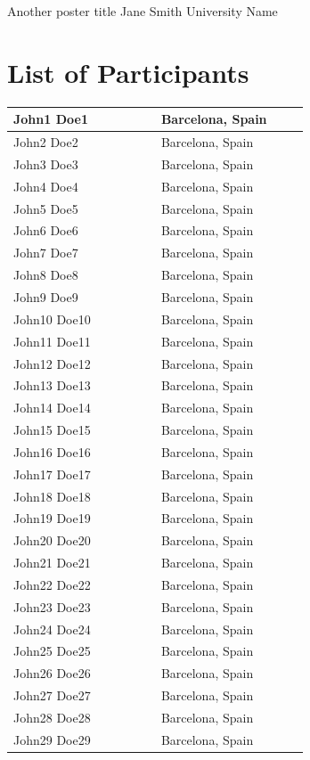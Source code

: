 \documentclass[
openany, %
parskip=full, %
12pt, %
a4paper, %
]{conferencebooklet} %
\begin{document}
	\poster
	{Another poster title} %
	{Jane Smith} %
	{University Name} %
	
	
	\chapter{List of Participants}
	
	\begingroup
	\begin{longtable}{p{0.4\linewidth} p{0.4\linewidth}}
		\hline
		John1 Doe1 & Barcelona, Spain \\ \hline
		John2 Doe2 & Barcelona, Spain \\ \hline
		John3 Doe3 & Barcelona, Spain \\ \hline
		John4 Doe4 & Barcelona, Spain \\ \hline
		John5 Doe5 & Barcelona, Spain \\ \hline
		John6 Doe6 & Barcelona, Spain \\ \hline
		John7 Doe7 & Barcelona, Spain \\ \hline
		John8 Doe8 & Barcelona, Spain \\ \hline
		John9 Doe9 & Barcelona, Spain \\ \hline
		John10 Doe10 & Barcelona, Spain \\ \hline
		John11 Doe11 & Barcelona, Spain \\ \hline
		John12 Doe12 & Barcelona, Spain \\ \hline
		John13 Doe13 & Barcelona, Spain \\ \hline
		John14 Doe14 & Barcelona, Spain \\ \hline
		John15 Doe15 & Barcelona, Spain \\ \hline
		John16 Doe16 & Barcelona, Spain \\ \hline
		John17 Doe17 & Barcelona, Spain \\ \hline
		John18 Doe18 & Barcelona, Spain \\ \hline
		John19 Doe19 & Barcelona, Spain \\ \hline
		John20 Doe20 & Barcelona, Spain \\ \hline
		John21 Doe21 & Barcelona, Spain \\ \hline
		John22 Doe22 & Barcelona, Spain \\ \hline
		John23 Doe23 & Barcelona, Spain \\ \hline
		John24 Doe24 & Barcelona, Spain \\ \hline
		John25 Doe25 & Barcelona, Spain \\ \hline
		John26 Doe26 & Barcelona, Spain \\ \hline
		John27 Doe27 & Barcelona, Spain \\ \hline
		John28 Doe28 & Barcelona, Spain \\ \hline
		John29 Doe29 & Barcelona, Spain \\ \hline
	\end{longtable}
	\endgroup
	
\end{document}
